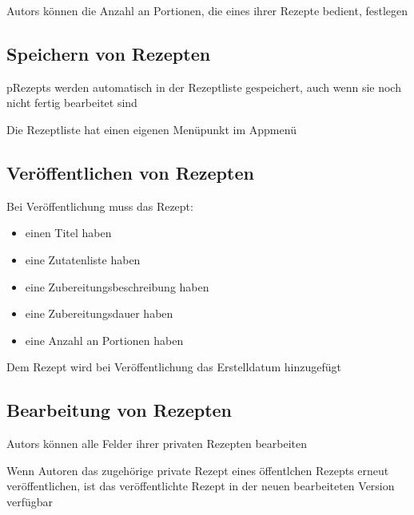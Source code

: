 			\Glspl{Autor} können die Anzahl an Portionen, die eines ihrer Rezepte bedient, festlegen

		
	\subsection{Speichern von Rezepten}
	
			\Glspl{pRezept} werden automatisch in der \gls{Rezeptliste} gespeichert, auch wenn sie noch nicht fertig bearbeitet sind
		
			Die \gls{Rezeptliste} hat einen eigenen Menüpunkt im Appmenü
		
	\subsection{Veröffentlichen von Rezepten}
	
			Bei Veröffentlichung muss das Rezept:
				\begin{itemize}[nosep]
					\item einen Titel haben
					\item eine Zutatenliste haben
					\item eine Zubereitungsbeschreibung haben
					\item eine Zubereitungsdauer haben
					\item eine Anzahl an Portionen haben
				\end{itemize}
	
		 Dem Rezept wird bei Veröffentlichung das Erstelldatum hinzugefügt
		
		
	\subsection{Bearbeitung von Rezepten}
	
		\glspl{Autor} können alle Felder ihrer privaten Rezepten \gls{bearbeiten}
		
	Wenn Autoren das zugehörige private Rezept eines öffentlchen Rezepts erneut veröffentlichen, ist das veröffentlichte Rezept in der neuen bearbeiteten Version verfügbar
	
